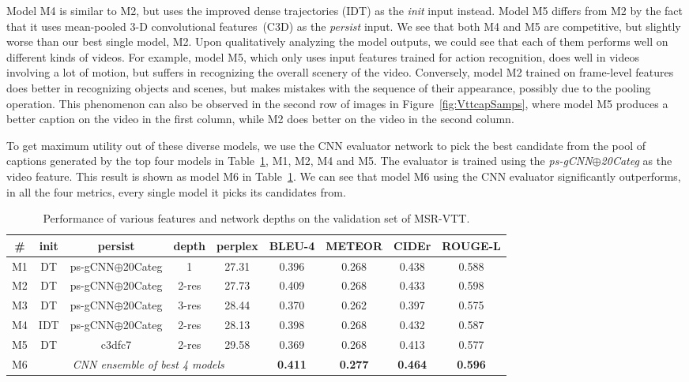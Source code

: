 Model M4 is similar to M2, but uses the improved dense trajectories (IDT) as
the \emph{init} input instead.
Model M5 differs from M2 by the fact that it uses mean-pooled 3-D
convolutional features~(C3D) as the \emph{persist} input.
We see that both M4 and M5 are competitive, but slightly worse than our best
single model, M2.
Upon qualitatively analyzing the model outputs, we could see that each of them
performs well on different kinds of videos.
For example, model M5, which only uses input features trained for action
recognition, does well in videos involving a lot of motion, but suffers in
recognizing the overall scenery of the video.
Conversely, model M2 trained on frame-level features does better in recognizing
objects and scenes, but makes mistakes with the sequence of their appearance,
possibly due to the pooling operation.
This phenomenon can also be observed in the second row of images in
Figure~\ref{fig:VttcapSamps}, where model M5 produces a better caption on the
video in the first column, while M2 does better on the video in the second
column.

To get maximum utility out of these diverse models, we use the CNN evaluator
network to pick the best candidate from the pool of captions generated by the
top four models in Table~\ref{tab:resVttFeat}, M1, M2, M4 and M5.
The evaluator is trained using the \emph{ps-gCNN$\oplus$20Categ} as the video
feature.
This result is shown as model M6 in Table~\ref{tab:resVttFeat}.
We can see that model M6 using the CNN evaluator significantly outperforms, in
all the four metrics, every single model it picks its candidates from.

\begin{table}[thp]
  \centering
  \begin{adjustbox}{center}
  \newcommand{\bs}{\small\bf}
  \begin{tabular}{|c|c|c|c|c|c|c|c|c|}
    \hline
    \bs\# &\bs init &\bs persist &\bs depth &\bs perplex &\bs BLEU-4 &\bs METEOR &\bs CIDEr &\bs ROUGE-L \\\hline\hline
    M1 & DT  & ps-gCNN$\oplus$20Categ & 1  & 27.31 & 0.396 & 0.268 & 0.438 & 0.588 \\
    M2 & DT  & ps-gCNN$\oplus$20Categ & 2-res  & 27.73 & 0.409 & 0.268 & 0.433 & 0.598 \\
    M3 & DT  & ps-gCNN$\oplus$20Categ & 3-res  & 28.44 & 0.370 & 0.262 & 0.397 & 0.575 \\\hline
    M4 & IDT & ps-gCNN$\oplus$20Categ & 2-res  & 28.13 & 0.398 & 0.268 & 0.432 & 0.587 \\
    M5 & DT  & c3dfc7       & 2-res  & 29.58 & 0.369 & 0.268 & 0.413 & 0.577 \\\hline
    M6 & \multicolumn{4}{c|}{\em CNN ensemble of best 4 models}
                                  & \bf0.411 & \bf0.277 & \bf0.464 & \bf0.596 \\\hline
    \hline
  \end{tabular}
  \end{adjustbox}
  \caption{Performance of various features and network depths on the validation
  set of MSR-VTT.}
  \label{tab:resVttFeat}
\end{table}

